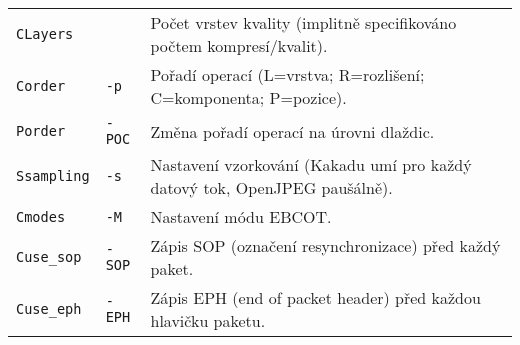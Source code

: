 \begin{center}
\begin{tabular}{|p{3cm}|p{2cm}|p{9cm}|}
			\hline
			\texttt{CLayers} & & Počet vrstev kvality (implitně specifikováno počtem kompresí/kvalit).\\
			\texttt{Corder} & \texttt{-p} & Pořadí operací (L=vrstva; R=rozlišení; C=komponenta; P=pozice).\\
			\texttt{Porder} & \texttt{-POC} & Změna pořadí operací na úrovni dlaždic.\\
			\texttt{Ssampling}& \texttt{-s}  & Nastavení vzorkování (Kakadu umí pro každý datový tok, OpenJPEG paušálně).\\
			\texttt{Cmodes} & \texttt{-M} & Nastavení módu EBCOT.\\
			
			\hline
			\texttt{Cuse\_sop} & \texttt{-SOP} & Zápis SOP (označení resynchronizace) před každý paket.\\
			\texttt{Cuse\_eph} & \texttt{-EPH} & Zápis EPH (end of packet header) před každou hlavičku paketu.\\
			\hline

			
			
			
			
			
			
			

			\hline
		\end{tabular}
		
		\end{center}


